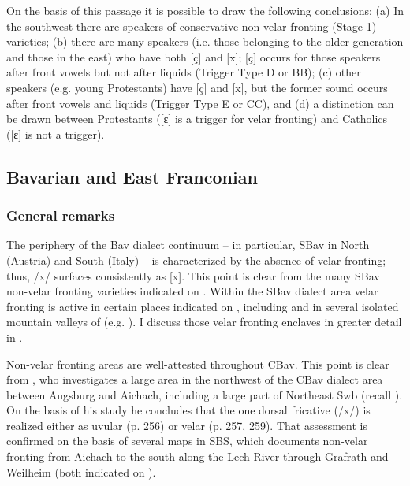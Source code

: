 On the basis of this passage it is possible to draw the following conclusions: (a) In the southwest there are speakers of conservative non-velar fronting (Stage 1) varieties; (b) there are many speakers (i.e. those belonging to the older generation and those in the east) who have both [ç] and [x]; [ç] occurs for those speakers after front vowels but not after liquids (Trigger Type D or BB); (c) other speakers (e.g. young Protestants) have [ç] and [x], but the former sound occurs after front vowels and liquids (Trigger Type E or CC), and (d) a distinction can be drawn between Protestants ([ɛ] is a trigger for velar fronting) and Catholics ([ɛ] is not a trigger).

\subsection{Bavarian and East Franconian}\label{sec:12.3.3}
\subsubsection{General remarks}
The periphery of the Bav dialect continuum -- in particular, SBav in North  (Austria) and South  (Italy) -- is characterized by the absence of velar fronting; thus, /x/ surfaces consistently as [x]. This point is clear from the many SBav non-velar fronting varieties indicated on . Within the SBav dialect area velar fronting is active in certain places indicated on , including  \citep{Moosmüller1991} and in several isolated mountain valleys of  (e.g. \citealt{Egger1909}). I discuss those velar fronting enclaves in greater detail in .

Non-velar fronting areas are well-attested throughout CBav. This point is clear from \citet{Ibrom1971}, who investigates a large area in the northwest of the CBav dialect area between Augsburg and Aichach, including a large part of Northeast Swb (recall ). On the basis of his study he concludes that the one dorsal fricative (/x/) is realized either as uvular (p. 256) or velar (p. 257, 259). That assessment is confirmed on the basis of several maps in SBS, which documents non-velar fronting from Aichach to the south along the Lech River through Grafrath and Weilheim (both indicated on ).


